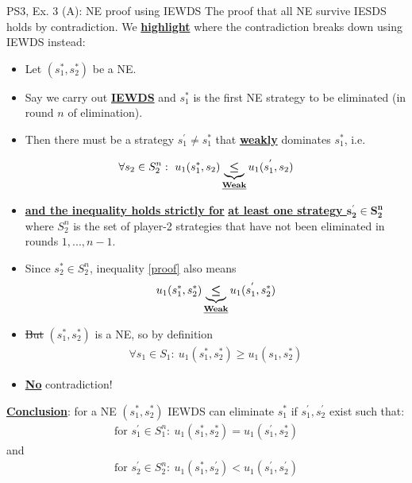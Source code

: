 \begin{frame}{PS3, Ex. 3 (A): NE proof using IEWDS}
    The proof that all NE survive IESDS holds by contradiction. We \underline{\textbf{highlight}} where the contradiction breaks down using IEWDS instead:
  \begin{multicols}{2}
    \begin{itemize}
      \item Let $(s_1^{*},s_2^{*})$ be a NE.
      \item Say we carry out \underline{\textbf{IEWDS}} and $s_1^{*}$ is the first NE strategy to be eliminated (in round $n$ of elimination).
      \item Then there must be a strategy $s_1^{'}\neq s_1^{*}$ that \underline{\textbf{weakly}} dominates $s_1^{*}$, i.e.
    \end{itemize}
      \begin{align}
        \forall s_2\in S_2^n:\ u_1(s_1^{*},s_2)\underbrace{\bm{\leq}}_\text{\underline{\textbf{Weak}}}u_1(s_1^{'},s_2)\label{proof}
      \end{align}
      \begin{itemize}
        \item[] \underline{\textbf{and the inequality holds strictly for}} \underline{\textbf{at least one strategy $\bm{s_2^{'}\in S_2^n}$}} where $S_2^n$ is the set of player-2 strategies that have not been eliminated in rounds $1,...,n-1$.
      \end{itemize}
  \vfill\null\columnbreak
    \begin{itemize}
      \item Since $s_2^{*}\in S_2^n$, inequality \eqref{proof} also means
      \begin{align*}
        u_1(s_1^{*},s_2^{*})\underbrace{\bm{\leq}}_\text{\underline{\textbf{Weak}}}u_1(s_1^{'},s_2^{*})
      \end{align*}
      \item \sout{But} $(s_1^{*},s_2^{*})$ is a NE, so by definition
      \begin{align*}
        \forall s_1\in S_1:\ u_1(s_1^{*},s_2^{*})\geq u_1(s_1,s_2^{*})
      \end{align*}
      \item \underline{\textbf{No}} contradiction!
    \end{itemize}
    \underline{\textbf{Conclusion}}: for a NE $(s_1^{*},s_2^{*})$ IEWDS can eliminate $s_1^{*}$ if $s_1^{'},s_2^{'}$ exist such that:
    \begin{align*}
      \text{for }s_1^{'}\in S_1^n:\ u_1(s_1^{*},s_2^{*})=u_1(s_1^{'},s_2^{*})
    \end{align*}
    and
    \begin{align*}
      \text{for }s_2^{'}\in S_2^n:\ u_1(s_1^{*},s_2^{'})<u_1(s_1^{'},s_2^{'})
    \end{align*}
  \vfill\null
  \end{multicols}
\end{frame}


